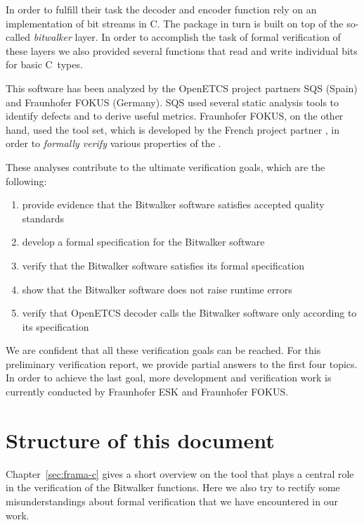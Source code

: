 \FloatBarrier

In order to fulfill their task the decoder and encoder function rely on an
implementation of bit streams in C.
The  package in turn is built on top of the so-called \emph{bitwalker} layer.
In order to accomplish the task of formal verification of these layers 
we also provided several functions that read and write individual bits for basic C~types.

This software has been analyzed by the OpenETCS project partners SQS (Spain)
and Fraunhofer FOKUS (Germany).
SQS used several static analysis tools to identify defects and to derive useful metrics.
Fraunhofer FOKUS, on the other hand, used the \framac tool set,
which is developed by the French project partner \cealist,
in order to \emph{formally verify} various properties of the \bitwalker.

These analyses contribute to the ultimate verification goals, which are the following:

\begin{enumerate}
\item provide evidence that the Bitwalker software satisfies 
      accepted quality standards
\item develop a formal specification for the Bitwalker software
\item verify that the Bitwalker software satisfies its formal specification
\item show that the Bitwalker software does not raise runtime errors
\item verify that OpenETCS decoder calls the Bitwalker software only
      according to its specification
\end{enumerate}

We are confident that all these verification goals can be reached.
For this preliminary verification report,
we provide partial answers to the first four topics.
In order to achieve the last goal, more development and verification
work is currently conducted by Fraunhofer ESK and Fraunhofer FOKUS. 

\section{Structure of this document}

Chapter~\ref{sec:frama-c} gives a short overview on the \framacwp tool
that plays a central role in the verification of the Bitwalker functions.
Here we also try to rectify some misunderstandings about formal verification
that we have encountered in our work.

